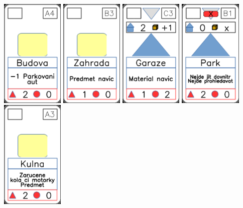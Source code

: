 \documentclass[a4paper]{article}
\begin{document}
	\includegraphics[width=3.0cm]{img-2_3}
	\includegraphics[width=3.0cm]{img-2_22}
	\includegraphics[width=3.0cm]{img-3_12}
	\includegraphics[width=3.0cm]{img-3_20}
	\includegraphics[width=3.0cm]{img-2_17}
\end{document}
